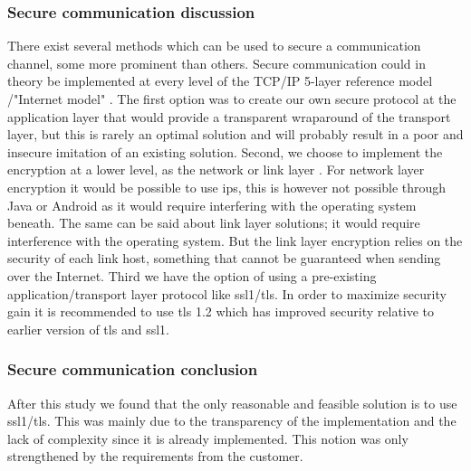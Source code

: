 \subsubsection{Secure communication discussion}
There exist several methods which can be used to secure a communication channel, some more prominent than others. Secure communication could in theory be implemented at every level of the TCP/IP 5-layer reference model \cite{bib:cn}/"Internet model" \cite{bib:rfc1122}. The first option was to create our own secure protocol at the application layer that would provide a transparent wraparound of the transport layer, but this is rarely an optimal solution and will probably result in a poor and insecure imitation of an existing solution.
\newline
\newline
Second, we choose to implement the encryption at a lower level, as the network or link layer \cite{bib:techtarget}. For network layer encryption it would be possible to use \gls{ips}, this is however not possible through Java or Android \cite{bib:ispec} as it would require interfering with the operating system beneath.  The same can be said about link layer solutions; it would require interference with the operating system. But the link layer encryption relies on the security of each link host, something that cannot be guaranteed when sending over the Internet.
\newline
\newline
Third we have the option of using a pre-existing application/transport layer protocol like \gls{ssl1}/\gls{tls}. In order to maximize security gain it is recommended to use \gls{tls} 1.2 \cite{bib:ssl}  which has improved security relative to earlier version of \gls{tls} and \gls{ssl1}.

\subsubsection{Secure communication conclusion}
After this study we found that the only reasonable and feasible solution is to use \gls{ssl1}/\gls{tls}. This was mainly due to the transparency of the implementation and the lack of complexity since it is already implemented. This notion was only strengthened by the requirements from the customer. 

